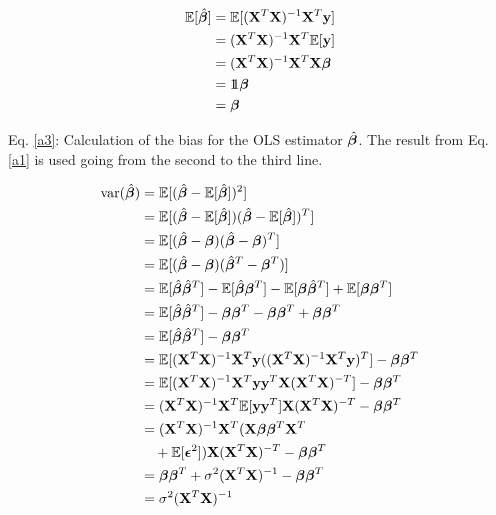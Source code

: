\begin{align}\label{a3}
    \fv{\hat{\bet}} & = \fv{(\mathbf{X}^T\mathbf{X})^{-1}\mathbf{X}^T \y} \nonumber \\ 
    & = (\mathbf{X}^T\mathbf{X})^{-1}\mathbf{X}^T \fv{\y} \nonumber \\ 
    & = (\mathbf{X}^T\mathbf{X})^{-1}\mathbf{X}^T \mathbf{X}\bet \nonumber \\
    & = \unit \bet \nonumber \\
    & = \bet 
\end{align}

Eq. \ref{a3}: Calculation of the bias for the OLS estimator $\hat{\bet}$. The result from Eq. \ref{a1} is used going from the second to the third line.

\begin{align}\label{a4}
    \text{var}(\hat{\bet}) & = \fv{(\hat{\bet}-\fv{\hat{\bet}})^2} \nonumber \\
    & = \fv{(\hat{\bet}-\fv{\hat{\bet}})(\hat{\bet}-\fv{\hat{\bet}})^T} \nonumber \\ 
    & = \fv{(\hat{\bet}-\bet)(\hat{\bet}-\bet)^T} \nonumber \\ 
    & = \fv{(\hat{\bet}-\bet)(\hat{\bet}^T-\bet^T)} \nonumber \\
    & = \fv{\hat{\bet}\hat{\bet}^T} - \fv{\hat{\bet}\bet^T} - \fv{\bet \hat{\bet}^T} + \fv{\bet \bet^T} \nonumber \\
    & = \fv{\hat{\bet}\hat{\bet}^T} - \bet\bet^T - \bet\bet^T + \bet\bet^T \nonumber \\
    & = \fv{\hat{\bet}\hat{\bet}^T} - \bet\bet^T \nonumber \\
    & = \fv{\betta(\betta)^T} - \bet\bet^T \nonumber \\
    & = \fv{\betta \y^T \mathbf{X}(\mathbf{X}^T\mathbf{X})^{-T}} - \bet\bet^T \nonumber \\
    & = (\mathbf{X}^T\mathbf{X})^{-1}\mathbf{X}^T\fv{\y\y^T}\mathbf{X}(\mathbf{X}^T\mathbf{X})^{-T} - \bet\bet^T \nonumber \\
    & = (\mathbf{X}^T\mathbf{X})^{-1}\mathbf{X}^T(\mathbf{X}\bet \bet^T \mathbf{X}^T \\ 
    & \quad + \fv{\boldsymbol{\epsilon}^2})\mathbf{X}(\mathbf{X}^T\mathbf{X})^{-T} - \bet\bet^T \nonumber \\
    & = \bet \bet^T + \sigma^2 (\mathbf{X}^T\mathbf{X})^{-1} - \bet \bet^T \nonumber \\
    & = \sigma^2 (\mathbf{X}^T\mathbf{X})^{-1}
\end{align}

